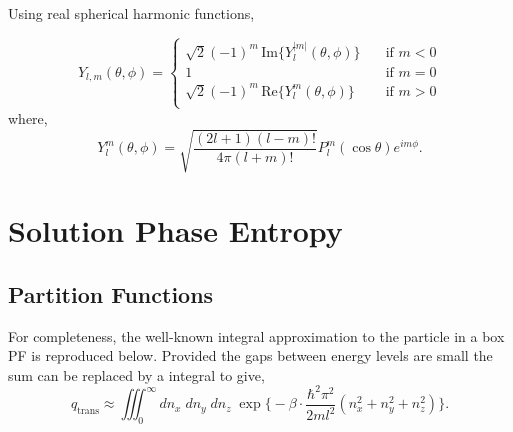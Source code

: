 \documentclass[../main.tex]{subfiles}
\begin{document}
Using real spherical harmonic functions,

\begin{equation}
	Y_{l,m}(\theta, \phi) = \begin{cases}
		\sqrt{2}(-1)^m \,\text{Im}\{Y_l^{|m|}(\theta, \phi)\} &\quad \text{if } m < 0 \\
		1 &\quad \text{if } m = 0 \\
		\sqrt{2}(-1)^m\,\text{Re}\{Y_l^{m}(\theta, \phi)\} &\quad \text{if } m > 0 \\
	\end{cases}
\end{equation}
where,
\begin{equation}
	Y_l^m (\theta, \phi) = \sqrt{\frac{(2l+1)(l- m)!}{4\pi (l+m)!}} P_l^{m}(\cos\theta)e^{im\phi}.
\end{equation}



\section{Solution Phase Entropy}
\subsection{Partition Functions} \label{section::appendix_igm_partition_functions}

For completeness, the well-known integral approximation to the particle in a box PF is reproduced below. Provided the gaps between energy levels are small the sum can be replaced by a integral to give,
\begin{equation}
	q_\text{trans} \approx \iiint_0^\infty dn_x\;dn_y\;dn_z\; \exp{ {\Big \{} -{\beta}\cdot  \frac{\hbar^2 \pi^2}{2ml^2}(n_x^2 + n_y^2 + n_z^2)}{\Big \}}.
\end{equation}
\end{document}
